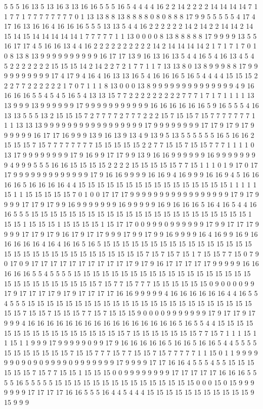 5 5 5 16 13 5 13 16 3 13 16 16 5 5 5 16 5 4 4 4 4 16 2 2 14 2 2 2 2 14 14 14 14 7 1 1 7 7 1 7 7 7 7 7 7 7 7 0 1 13 13 8 8 13 8 8 8 8 0 8 0 8 8 8 17 9 9 5 5 5 5 5 4 17 4 17 16 13 16 16 4 16 16 16 5 5 5 13 13 5 4 4 16 2 2 2 2 2 2 14 2 14 2 2 14 14 2 14 15 14 15 14 14 14 14 14 1 7 7 7 7 7 1 1 13 0 0 0 0 8 13 8 8 8 8 8 17 9 9 9 9 13 5 5 16 17 17 4 5 16 16 13 4 4 16 2 2 2 2 2 2 2 2 2 2 14 2 14 14 14 14 2 1 7 1 7 1 7 0 1 0 8 13 8 13 9 9 9 9 9 9 9 9 9 9 16 17 17 13 9 16 13 16 13 5 4 4 16 5 4 16 13 4 5 4 5 2 2 2 2 2 2 2 15 15 15 14 2 14 2 2 7 2 1 7 7 1 1 7 13 13 8 0 13 8 9 9 9 8 8 17 9 9 9 9 9 9 9 9 9 9 17 4 17 9 4 16 4 16 13 13 16 5 4 16 16 16 5 16 5 4 4 4 4 15 15 15 2 2 2 7 7 2 2 2 2 2 2 1 7 0 7 1 1 1 8 13 0 0 0 13 8 9 9 9 9 9 9 9 9 9 9 9 9 9 9 4 9 16 16 16 16 5 5 4 5 4 5 16 5 4 13 13 15 7 7 2 2 2 2 2 2 2 2 2 7 7 7 1 7 1 7 1 1 1 1 13 13 9 9 9 13 9 9 9 9 9 9 17 9 9 9 9 9 9 9 9 9 9 9 16 16 16 16 16 16 5 9 16 5 5 5 4 16 13 13 5 5 5 13 2 15 15 15 7 2 7 7 7 7 2 7 7 7 2 2 2 15 7 15 15 7 15 7 7 7 7 7 7 7 1 1 1 13 13 13 9 9 9 9 9 9 9 9 9 9 9 9 9 9 9 9 9 17 9 9 9 9 9 9 9 9 17 17 9 17 9 17 9 9 9 9 9 9 16 17 17 16 9 9 9 13 9 16 13 9 13 4 9 13 9 5 13 5 5 5 5 5 5 16 5 16 16 2 15 15 15 7 15 7 7 7 7 7 7 7 7 15 15 15 15 15 2 2 7 7 15 15 7 15 15 7 7 7 1 1 1 1 0 13 17 9 9 9 9 9 9 9 9 17 9 16 9 9 17 17 9 9 13 9 16 16 9 9 9 9 9 9 16 9 9 9 9 9 9 9 9 4 9 9 9 5 5 5 16 16 15 15 15 15 2 2 2 2 15 15 15 15 15 7 7 15 1 1 1 0 1 9 17 0 17 17 9 9 9 9 9 9 9 9 9 9 9 9 9 17 9 16 16 9 9 9 9 16 16 9 4 16 9 9 9 16 16 9 4 5 16 16 16 16 5 16 16 16 16 4 4 15 15 15 15 15 15 15 15 15 15 15 15 15 15 15 15 1 1 1 1 1 15 1 1 15 15 15 15 15 7 0 1 0 0 17 17 17 9 9 9 9 9 9 9 9 9 9 9 9 9 9 9 9 9 17 9 17 9 9 9 9 17 17 9 17 9 9 16 9 9 9 9 9 9 9 16 9 9 9 9 9 16 9 16 16 16 5 16 4 16 5 4 4 16 16 5 5 5 15 15 15 15 15 15 15 15 15 15 15 15 15 15 15 15 15 15 15 15 15 15 15 1 15 15 1 15 15 15 1 15 15 15 15 1 15 17 17 0 0 9 9 9 0 9 9 9 9 9 9 17 9 9 17 17 17 9 9 9 9 17 17 9 17 9 16 17 9 17 17 9 9 9 17 9 9 17 9 9 16 9 9 9 9 16 4 16 9 9 16 9 16 16 16 16 16 4 16 4 16 16 5 16 5 15 15 15 15 15 15 15 15 15 15 15 15 15 15 15 15 15 15 15 15 15 15 15 15 15 15 15 15 15 15 15 7 15 7 15 7 15 1 7 15 15 7 7 15 0 7 9 0 17 0 9 17 17 17 17 17 17 17 17 17 17 17 9 17 9 16 17 17 17 17 17 9 9 9 9 9 16 16 16 16 16 5 5 4 5 5 5 5 15 15 15 15 15 15 15 15 15 15 15 15 15 15 15 15 15 15 15 15 15 15 15 15 15 15 15 15 15 7 15 7 7 15 7 7 7 15 15 15 15 15 15 0 9 0 0 0 0 9 9 17 9 17 17 17 17 9 17 9 17 17 17 17 16 16 9 9 9 9 9 4 16 16 16 16 16 16 4 4 16 5 5 4 5 5 5 15 15 15 15 15 15 15 15 15 15 15 15 15 15 15 15 15 15 15 15 15 15 15 15 15 15 7 15 15 7 15 15 15 7 7 15 7 15 15 15 9 0 0 0 0 9 9 9 9 9 9 9 17 9 17 17 9 17 9 9 9 4 16 16 16 16 16 16 16 16 16 16 16 16 16 16 16 16 5 16 5 5 4 4 15 15 15 15 15 15 15 15 15 15 15 15 15 15 15 15 15 7 15 15 15 15 15 15 15 7 7 15 7 1 1 1 15 1 1 15 1 1 9 9 9 17 9 9 9 9 9 0 9 9 17 9 16 16 16 16 16 5 16 16 5 16 16 5 4 4 5 5 5 5 15 15 15 15 15 15 15 7 15 15 7 7 7 15 7 7 15 15 7 15 7 7 7 7 7 1 1 15 0 1 1 9 9 9 9 9 9 0 9 0 9 0 9 9 9 9 0 9 9 9 9 9 9 9 17 9 9 9 9 17 17 16 16 4 5 5 5 4 5 5 15 15 15 15 15 15 7 15 7 7 15 15 1 15 15 15 0 0 9 9 9 9 9 9 9 9 17 17 17 17 17 16 16 16 5 5 5 5 16 5 5 5 5 5 15 15 15 15 15 15 15 15 15 15 15 15 15 15 15 0 0 0 15 0 15 9 9 9 9 9 9 9 17 17 17 17 16 16 5 5 5 16 4 4 5 4 4 4 15 15 15 15 15 15 15 15 15 15 15 9 15 9 9 9 
